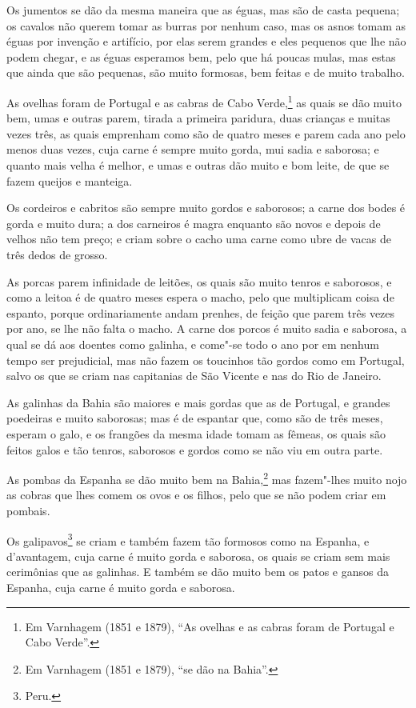 \begin{linenumbers}
Os jumentos se dão da mesma maneira que as éguas, mas são de casta pequena; os cavalos não
querem tomar as burras por nenhum caso, mas os asnos tomam as éguas por invenção e
artifício, por elas serem grandes e eles pequenos que lhe não podem chegar, e as éguas
esperamos bem, pelo que há poucas mulas, mas estas que ainda
que são pequenas, são muito formosas, bem feitas e de muito trabalho.

As ovelhas foram de Portugal e as cabras de Cabo Verde,\footnote{ Em Varnhagem (1851 e
1879), ``As ovelhas e as cabras foram de Portugal e Cabo Verde''.} as quais se dão muito
bem, umas e outras parem, tirada a primeira paridura, duas crianças e muitas vezes três,
as quais emprenham como são de quatro meses e parem cada ano pelo menos duas vezes, cuja
carne é sempre muito gorda, mui sadia e saborosa; e quanto mais velha é melhor, e umas e
outras dão muito e bom leite, de que se fazem queijos e manteiga.

Os cordeiros e cabritos são sempre muito gordos e saborosos; a carne dos bodes é gorda e
muito dura; a dos carneiros é magra enquanto são novos e depois de velhos não tem preço; e
criam sobre o cacho uma carne como ubre de vacas de três dedos de grosso.

As porcas parem infinidade de leitões, os quais são muito tenros e saborosos, e como a
leitoa é de quatro meses espera o macho, pelo que multiplicam coisa de espanto, porque
ordinariamente andam prenhes, de feição que parem três vezes por ano, se lhe não falta o
macho. A carne dos porcos é muito sadia e saborosa, a qual se dá aos doentes como galinha,
e come"-se todo o ano por em nenhum tempo ser prejudicial, mas não fazem os toucinhos tão
gordos como em Portugal, salvo os que se criam nas capitanias de São Vicente e nas do Rio
de Janeiro.

As galinhas da Bahia são maiores e mais gordas que as de Portugal, e grandes poedeiras e
muito saborosas; mas é de espantar que, como são de três meses, esperam o galo, e os
frangões da mesma idade tomam as fêmeas, os quais são feitos galos e tão tenros, saborosos
e gordos como se não viu em outra parte.

As pombas da Espanha se dão muito bem na Bahia,\footnote{ Em Varnhagem (1851 e 1879), ``se
dão na Bahia''.} mas fazem"-lhes muito nojo as cobras que lhes comem os ovos e os filhos,
pelo que se não podem criar em pombais.

Os galipavos\footnote{ Peru.} se criam e também fazem tão formosos como na Espanha, e
d'avantagem, cuja carne é muito gorda e saborosa, os quais se criam sem mais cerimônias que
as galinhas. E também se dão muito bem os patos e gansos da Espanha, cuja carne é muito
gorda e saborosa.


\end{linenumbers}
